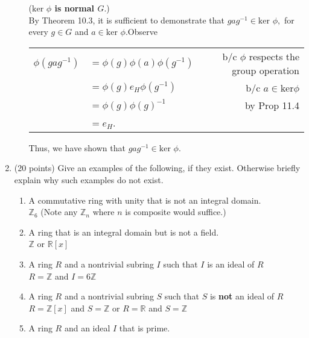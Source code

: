 \documentclass[12pt]{article}
\renewcommand{\emph}[1]{\textsf{\textbf{#1}}}
\newcommand{\bbZ}{\mathbb{Z}}
\newcommand{\bbR}{\mathbb{R}}
\begin{document}
\begin{enumerate}
\begin{enumerate}
	(\textbf{$\text{ker }\phi$ is normal $G.$})\\
	 By Theorem 10.3, it is sufficient to demonstrate that $gag^{-1} \in \text{ker }\phi,$ for every $g \in G$ and $a \in \text{ker }\phi.$Observe \\
	\begin{tabular}{rlr}
	$\phi(gag^{-1})$&$=\phi(g)\phi(a)\phi(g^{-1})$& b/c $\phi$ respects the group operation\\
	&$=\phi(g)e_H\phi(g^{-1})$& b/c $a \in \text{ker}\phi$ \\
	&$=\phi(g)\phi(g)^{-1}$&by Prop 11.4\\
	&$=e_H$.&\\
	\end{tabular}
	
	Thus, we have shown that $gag^{-1} \in \text{ker }\phi.$\\
	
		\end{enumerate}
\item (20 points) Give an examples of the following, if they exist. Otherwise briefly explain why such examples do not exist.
	\begin{enumerate}
	\item A commutative ring with unity that is not an integral domain.\\
	
	$\bbZ_6$ (Note any $\bbZ_n$ where $n$ is composite would suffice.)
	\vfill
	\item A ring that is an integral domain but is not a field.\\
	
	$\bbZ$ or $\bbR[x]$ \\
	\vfill
	\item A ring $R$ and a nontrivial subring $I$ such that $I$ is an ideal of $R$\\
	
	$R=\bbZ$ and $I=6\bbZ$\\
	
	\vfill
	\item A ring $R$ and a nontrivial subring $S$ such that $S$ is \emph{not} an ideal of $R$\\
	
	$R=\bbZ[x]$ and $S=\bbZ$ or $R=\bbR$ and $S=\bbZ$\\
	\vfill
	\item A ring $R$ and an ideal $I$ that is prime.\\
	

\end{enumerate}
\end{enumerate}
\end{document}
